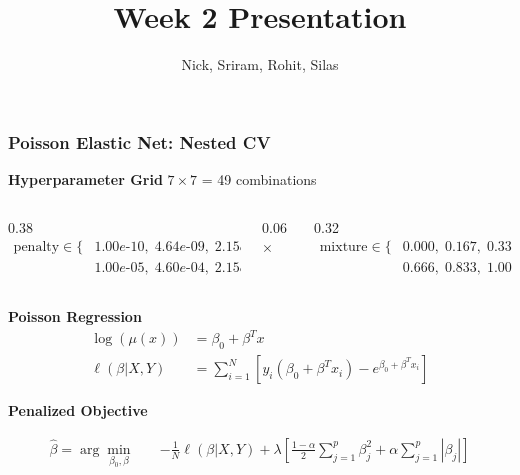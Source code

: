 \documentclass{beamer}
\title{Week 2 Presentation}
\author{Nick, Sriram, Rohit, Silas}
\begin{document}
\begin{frame}
    \frametitle{Poisson Elastic Net: Nested CV}

    \small

    \textbf{Hyperparameter Grid} $7 \times 7$ = 49 combinations

    {\footnotesize
    \begin{columns}[c]
        \begin{column}{0.38\textwidth}
            \begin{align*}
                \text{penalty} \in \{&
                1.00e\text{-}10,\;
                4.64e\text{-}09,\;
                2.15e\text{-}07,\\
                &1.00e\text{-}05,\;
                4.60e\text{-}04,\;
                2.15e\text{-}02,\;
                1.00
                \}
            \end{align*}
        \end{column}

        \begin{column}{0.06\textwidth}
            \centering
            $\times$
        \end{column}

        \begin{column}{0.32\textwidth}
            \begin{align*}
                \text{mixture} \in \{&
                0.000,\;0.167,\;0.333,\;0.500,\\
                &0.666,\;0.833,\;1.000
                \}
            \end{align*}
        \end{column}
    \end{columns}
    }

    \textbf{Poisson Regression}
    \vspace{-.2cm}
    \begin{align*}
        \log(\mu(x)) &= \beta_0 + \beta^T x\\
        \ell(\beta|X,Y) &= \sum_{i=1}^N
        \left[
        y_i(\beta_0+\beta^Tx_i)
        - e^{\beta_0+\beta^Tx_i}
        \right]
    \end{align*}

    \vspace{-0.2cm}

    \textbf{Penalized Objective}

    \vspace{-0.1cm}

    \footnotesize
    \[
    \begin{aligned}
    \hat{\beta} = \arg\min_{\beta_0,\beta}
    \quad &-\frac{1}{N}\ell(\beta|X,Y) +\lambda\left[
    \frac{1-\alpha}{2}\sum_{j=1}^p\beta_j^2
    +\alpha\sum_{j=1}^p|\beta_j|
    \right]
    \end{aligned}
    \]


\end{frame}
\end{document}
